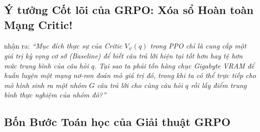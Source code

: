 \subsection{Ý tưởng Cốt lõi của GRPO: Xóa sổ Hoàn toàn Mạng Critic!}
\citet{shao2024deepseekmath} nhận ra: \textit{``Mục đích thực sự của Critic $V_\psi(q)$ trong PPO chỉ là cung cấp một giá trị kỳ vọng cơ sở (Baseline) để biết câu trả lời hiện tại tốt hơn hay tệ hơn mức trung bình của câu hỏi $q$. Tại sao ta phải tốn hàng chục Gigabyte VRAM để huấn luyện một mạng nơ-ron đoán mò giá trị đó, trong khi ta có thể trực tiếp cho mô hình sinh ra một nhóm $G$ câu trả lời cho cùng câu hỏi $q$ rồi lấy điểm trung bình thực nghiệm của nhóm đó?''}

\subsection{Bốn Bước Toán học của Giải thuật GRPO}
